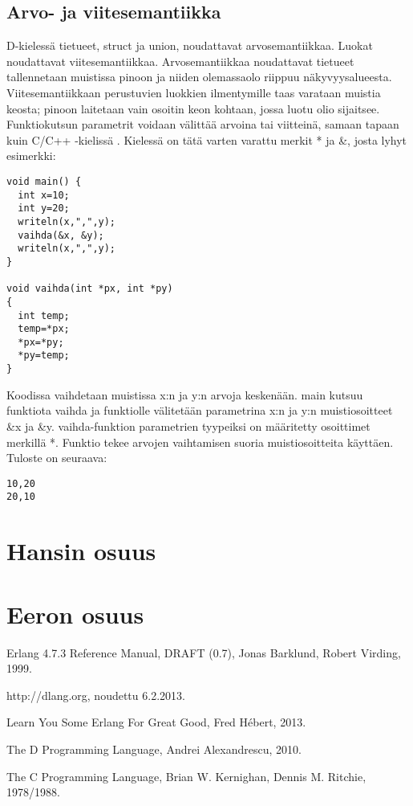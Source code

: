 \documentclass[11pt,oneside,a4paper]{article}
\begin{document}
\subsection{Arvo- ja viitesemantiikka}
D-kielessä tietueet, struct ja union, noudattavat arvosemantiikkaa. Luokat noudattavat viitesemantiikkaa. Arvosemantiikkaa noudattavat tietueet tallennetaan muistissa pinoon ja niiden olemassaolo riippuu näkyvyysalueesta. Viitesemantiikkaan perustuvien luokkien ilmentymille taas varataan muistia keosta; pinoon laitetaan vain osoitin keon kohtaan, jossa luotu olio sijaitsee. Funktiokutsun parametrit voidaan välittää arvoina tai viitteinä, samaan tapaan kuin C/C++ -kielissä \cite{KRR88}. Kielessä on tätä varten varattu merkit * ja \&, josta lyhyt esimerkki:
\begin{verbatim}
void main() {
  int x=10;
  int y=20;
  writeln(x,",",y);
  vaihda(&x, &y);
  writeln(x,",",y);
}

void vaihda(int *px, int *py)
{
  int temp;
  temp=*px;
  *px=*py;
  *py=temp;
}
\end{verbatim}
Koodissa vaihdetaan muistissa x:n ja y:n arvoja keskenään. main kutsuu funktiota vaihda ja funktiolle välitetään parametrina x:n ja y:n muistiosoitteet \&x ja \&y. vaihda-funktion parametrien tyypeiksi on määritetty osoittimet merkillä *. Funktio tekee arvojen vaihtamisen suoria muistiosoitteita käyttäen. Tuloste on seuraava:
\begin{verbatim}
10,20
20,10
\end{verbatim}

\section{Hansin osuus}

\section{Eeron osuus}






\begin{thebibliography}{99}

 Erlang 4.7.3 Reference Manual, DRAFT (0.7), Jonas
Barklund, Robert Virding, 1999. 

 http://dlang.org, noudettu 6.2.2013.

 Learn You Some Erlang For Great Good, Fred Hébert, 2013.

 The D Programming Language, Andrei Alexandrescu, 2010.

 The C Programming Language, Brian W. Kernighan, Dennis M. Ritchie, 1978/1988.

\end{thebibliography}
\end{document}
